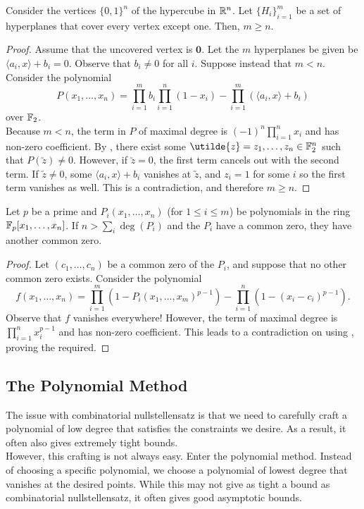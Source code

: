 	\begin{prop}
		Consider the vertices $\{0,1\}^n$ of the hypercube in $\mathbb{R}^n$. Let $\{H_i\}_{i=1}^m$ be a set of hyperplanes that cover every vertex except one. Then, $m \ge n$.
	\end{prop}
	\begin{proof}
		Assume that the uncovered vertex is $\textbf{0}$. Let the $m$ hyperplanes be given be $\langle a_i, x \rangle + b_i = 0$. Observe that $b_i \ne 0$ for all $i$. Suppose instead that $m < n$. Consider the polynomial
		\[ P(x_1,\ldots,x_n) = \prod_{i=1}^m b_i \prod_{i=1}^n (1-x_i) - \prod_{i=1}^m (\langle a_i, x\rangle + b_i) \]
		over $\mathbb{F}_2$.\\
		Because $m < n$, the term in $P$ of maximal degree is $(-1)^n \prod_{i=1}^n x_i$ and has non-zero coefficient. By , there exist some $\utilde{z} = z_1,\ldots,z_n \in \F_2^n$ such that $P(\utilde{z}) \ne 0$. However, if $\utilde{z} = 0$, the first term cancels out with the second term. If $\utilde{z} \ne 0$, some $\langle a_i,x\rangle + b_i$ vanishes at $\utilde{z}$, and $z_i = 1$ for some $i$ so the first term vanishes as well. This is a contradiction, and therefore $m \ge n$.
	\end{proof}

	\begin{prop}
		Let $p$ be a prime and $P_i(x_1,\ldots,x_n)$ (for $1\le i\le m$) be polynomials in the ring $\mathbb{F}_p[x_1,\ldots,x_n]$. If $n > \sum_i \deg(P_i)$ and the $P_i$ have a common zero, they have another common zero.
	\end{prop}
	\begin{proof}
		Let $(c_1,\ldots,c_n)$ be a common zero of the $P_i$, and suppose that no other common zero exists. Consider the polynomial
		\[ f(x_1,\ldots,x_n) = \prod_{i=1}^m \left( 1 - P_i(x_1,\ldots,x_m)^{p-1} \right) - \prod_{i=1}^n \left( 1 - (x_i - c_i)^{p-1} \right). \]
		Observe that $f$ vanishes everywhere! However, the term of maximal degree is $\prod_{i=1}^n x_i^{p-1}$ and has non-zero coefficient. This leads to a contradiction on using , proving the required.
	\end{proof}



\subsection{The Polynomial Method}

	The issue with combinatorial nullstellensatz is that we need to carefully craft a polynomial of low degree that satisfies the constraints we desire. As a result, it often also gives extremely tight bounds.\\
	However, this crafting is not always easy. Enter the polynomial method. Instead of choosing a specific polynomial, we choose a polynomial of lowest degree that vanishes at the desired points. While this may not give as tight a bound as combinatorial nullstellensatz, it often gives good asymptotic bounds.

